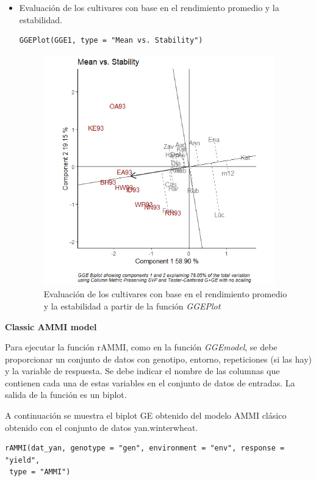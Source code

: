 \begin{itemize}
\item Evaluación de los cultivares con base en el rendimiento promedio y la estabilidad.

\begin{lstlisting}
GGEPlot(GGE1, type = "Mean vs. Stability")
\end{lstlisting}

\begin{figure}[h!]
	\begin{center}
		\includegraphics[width=10cm]{./Graficos/MeanvsStability.png}
	\end{center}
	\caption{Evaluación de los cultivares con base en el rendimiento promedio y la estabilidad a partir de la función \emph{GGEPlot}}
\end{figure}

\end{itemize}


\textbf{Classic AMMI model}

Para ejecutar la función rAMMI, como en la función \emph{GGEmodel}, se debe proporcionar un conjunto de datos con genotipo, entorno, repeticiones (si las hay) y la variable de respuesta. Se debe indicar el nombre de las columnas que contienen cada una de estas variables en el conjunto de datos de entradas. La salida de la función es un biplot.

A continuación se muestra el biplot GE obtenido del modelo AMMI clásico obtenido con el conjunto de datos yan.winterwheat.

\begin{lstlisting}
rAMMI(dat_yan, genotype = "gen", environment = "env", response = "yield",
 type = "AMMI")
\end{lstlisting}

